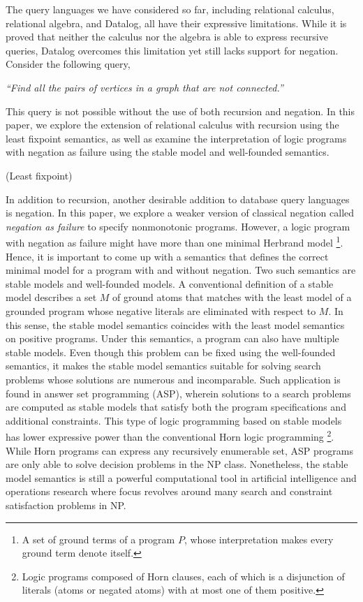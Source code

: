 The query languages we have considered so far, including relational calculus, 
relational algebra, and Datalog, all have their expressive limitations. While 
it is proved that neither the calculus nor the algebra is able to express 
recursive queries, Datalog overcomes this limitation yet still lacks support 
for negation. Consider the following query,
\begin{displayquote}
    \textit{``Find all the pairs of vertices in a 
    graph that are not connected.''}
\end{displayquote}
This query is not possible without the use of both recursion and negation. 
In this paper, we explore the extension of relational calculus with 
recursion using the least fixpoint semantics, as well as examine the interpretation  
of logic programs with negation as failure using the stable model 
and well-founded semantics.

(Least fixpoint)

In addition to recursion, another desirable addition to database query languages 
is negation. In this paper, we explore a weaker version of classical negation called 
\emph{negation as failure} to specify nonmonotonic programs. However, a logic 
program with negation as failure might have more than one minimal Herbrand model 
\footnote{A set of ground terms of a program $P$, whose interpretation 
makes every ground term denote itself.}. Hence, it is important 
to come up with a semantics that defines the correct minimal 
model for a program with and without negation. Two such semantics 
are stable models and well-founded models. A conventional 
definition of a stable model
describes a set $M$ of ground atoms that matches with the least model 
of a grounded program whose negative literals are eliminated with respect to 
$M$. In this sense, the stable model semantics coincides with 
the least model semantics on positive programs. Under this 
semantics, a program can also have multiple stable models. Even though 
this problem can be fixed using the well-founded semantics, 
it makes the stable model semantics suitable for solving search 
problems whose solutions are numerous and incomparable. Such 
application is found in answer set programming (ASP), wherein 
solutions to a search problems are computed as stable models 
that satisfy both the program specifications and additional constraints. 
This type of logic programming based on stable models has lower 
expressive power than the conventional Horn logic programming 
\footnote{Logic programs composed of Horn clauses, 
each of which is a disjunction of literals (atoms or negated atoms) with at most one of 
them positive.}. While Horn programs can express any recursively enumerable set, 
ASP programs are only able to solve decision problems in the NP class. 
Nonetheless, the stable model semantics is still 
a powerful computational tool in artificial 
intelligence and operations research where focus 
revolves around many search and constraint satisfaction 
problems in NP.

